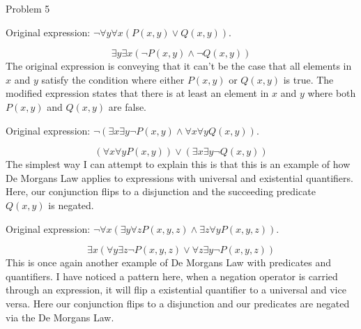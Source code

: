 \begin{problem}{Problem 5}
    \begin{Highlight}
        Original expression: $\neg \forall y \forall x (P(x,y) \vee Q(x,y))$.

        \begin{equation}
            \exists y \exists x (\neg P(x,y) \wedge \neg Q(x,y))
        \end{equation}
        The original expression is conveying that it can't be the case that all elements in $x$ and $y$ satisfy the condition where either $P(x,y)$ or $Q(x,y)$ is true. The modified expression states that there is at least
        an element in $x$ and $y$ where both $P(x,y)$ and $Q(x,y)$ are false.
    \end{Highlight}

    \begin{Highlight}
        Original expression: $\neg(\exists x \exists y \neg P(x,y) \wedge \forall x \forall y Q(x,y))$.

        \begin{equation}
            (\forall x \forall y P(x,y)) \vee (\exists x \exists y \neg Q(x,y))
        \end{equation}
        The simplest way I can attempt to explain this is that this is an example of how De Morgans Law applies to expressions with universal and existential quantifiers. Here, our conjunction flips to a disjunction and the 
        succeeding predicate $Q(x,y)$ is negated.
    \end{Highlight}

    \begin{Highlight}
        Original expression: $\neg \forall x (\exists y \forall z P(x,y,z) \wedge \exists z \forall y P(x,y,z))$.

        \begin{equation}
            \exists x (\forall y \exists z \neg P(x,y,z) \vee \forall z \exists y \neg P(x,y,z))
        \end{equation}
        This is once again another example of De Morgans Law with predicates and quantifiers. I have noticed a pattern here, when a negation operator is carried through an expression, it will flip a existential quantifier to a 
        universal and vice versa. Here our conjunction flips to a disjunction and our predicates are negated via the De Morgans Law.
    \end{Highlight}
\end{problem}

